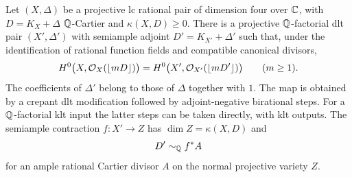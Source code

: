 \begin{proposition}\label{prop:semiample-model}
Let $(X,\Delta)$ be a projective lc rational pair of dimension four
over $\mathbb C$, with $D=K_X+\Delta$ \(\mathbb Q\)-Cartier and
$\kappa(X,D)\geq0$. There is a projective \(\mathbb Q\)-factorial dlt pair
$(X',\Delta')$ with semiample adjoint $D'=K_{X'}+\Delta'$ such that,
under the identification of rational function fields and compatible
canonical divisors,
\begin{equation}\label{eq:all-rounded-sections}
 H^0\bigl(X,\mathcal O_X(\lfloor mD\rfloor)\bigr)
 =H^0\bigl(X',\mathcal O_{X'}(\lfloor mD'\rfloor)\bigr)
 \qquad(m\geq1).
\end{equation}
The coefficients of $\Delta'$ belong to those of $\Delta$ together
with $1$. The map is obtained by a crepant dlt modification followed
by adjoint-negative birational steps. For a \(\mathbb Q\)-factorial klt
input the latter steps can be taken directly, with klt outputs.
The semiample contraction $f:X'\to Z$ has
$\dim Z=\kappa(X,D)$ and
\[
 D'\sim_{\mathbb Q}f^*A
\]
for an ample rational Cartier divisor $A$ on the normal projective
variety $Z$.
\end{proposition}

